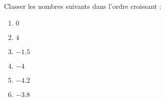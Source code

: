 
\begin{exercice}\label{exo2smath-0197}

    Classer les nombres suivants dans l'ordre croissant :
    \begin{multicols}{3}
        \begin{enumerate}
            \item
                \( 0\)
            \item
                \( 4\)
            \item
                \( -1.5\)
            \item
                \( -4\)
            \item
                \( -4.2\)
            \item
                \( -3.8\)
        \end{enumerate}
    \end{multicols}

\end{exercice}
